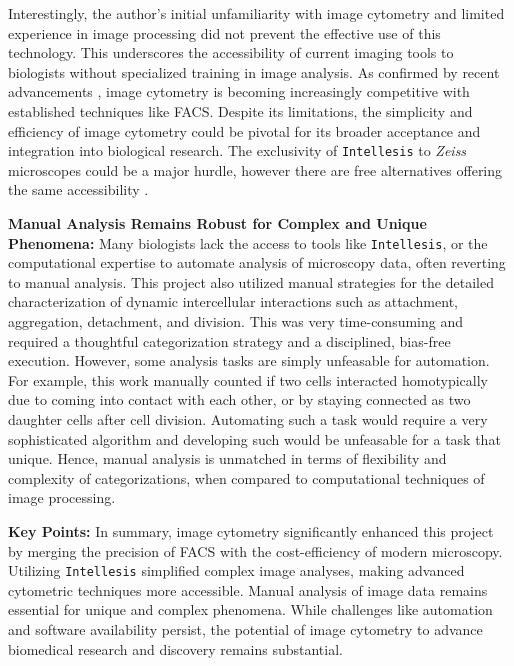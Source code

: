 Interestingly, the author’s initial unfamiliarity with image cytometry and
limited experience in image processing did not prevent the effective use of this
technology. This underscores the accessibility of current imaging tools to
biologists without specialized training in image analysis. As confirmed by
recent advancements \cite{nittaRapidHighthroughputCell2023}, image cytometry is
becoming increasingly competitive with established techniques like \ac{FACS}.
Despite its limitations, the simplicity and efficiency of image cytometry could
be pivotal for its broader acceptance and integration into biological research.
The exclusivity of \texttt{Intellesis} to \textit{Zeiss} microscopes could be a
major hurdle, however there are free alternatives offering the same
accessibility \cite{bergIlastikInteractiveMachine2019}.



\textbf{Manual Analysis Remains Robust for Complex and Unique Phenomena:}
Many biologists lack the access to tools like \texttt{Intellesis}, or the
computational expertise to automate analysis of microscopy data, often reverting
to manual analysis. This project also utilized manual strategies for the
detailed characterization of dynamic intercellular interactions such as
attachment, aggregation, detachment, and division. This was very time-consuming
and required a thoughtful categorization strategy and a disciplined, bias-free
execution. However, some analysis tasks are simply unfeasable for automation.
For example, this work manually counted if two \INA cells interacted
homotypically due to coming into contact with each other, or by staying
connected as two daughter cells after cell division. Automating such a task
would require a very sophisticated algorithm and developing such would be
unfeasable for a task that unique. Hence, manual analysis is unmatched in terms
of flexibility and complexity of categorizations, when compared to computational
techniques of image processing.





\textbf{Key Points:} In summary, image cytometry significantly enhanced this
project by merging the precision of \ac{FACS} with the cost-efficiency of modern
microscopy. Utilizing \texttt{Intellesis} simplified complex image analyses,
making advanced cytometric techniques more accessible. Manual analysis of image
data remains essential for unique and complex phenomena. While challenges like
automation and software availability persist, the potential of image cytometry
to advance biomedical research and discovery remains substantial.




